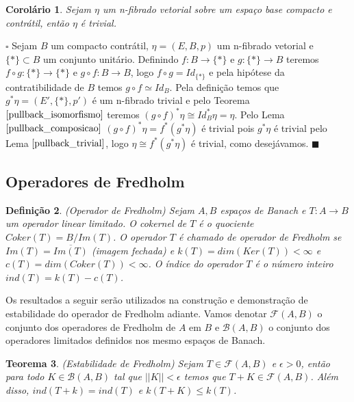 \documentclass[12pt]{book}
\newtheorem{teorema}{Teorema}[section]
\newtheorem{corolario}[teorema]{Corolário}
\newtheorem{definicao}[teorema]{Definição}
\newenvironment{prova}[1]{$\square$ #1}{\hfill$\blacksquare$}
\newcommand{\operadoresfredholm}[2]{\mathcal{F}(#1, #2)}
\newcommand{\operadoreslimitados}[2]{\mathcal{B}(#1, #2)}
\begin{document}
	\begin{corolario}\label{pullback_contratil}
		Sejam $\eta$ um n-fibrado vetorial sobre um espaço base compacto e contrátil, então $\eta$ é trivial.
	\end{corolario}
	\begin{prova}
		Sejam $B$ um compacto contrátil, $\eta=(E, B, p)$ um n-fibrado vetorial e $\{*\} \subset B$ um conjunto unitário. Definindo $f:B\to \{*\}$ e $g:\{*\}\to B$ teremos $f\circ g : \{*\} \to \{*\}$ e $g\circ f:B\to B$, logo $f\circ g = Id_{\{*\}}$ e pela hipótese da contratibilidade de $B$ temos $g\circ f \simeq Id_{B}$. Pela definição temos que $g^{*}\eta = (E', \{*\}, p')$ é um n-fibrado trivial e pelo Teorema $\ref{pullback_isomorfismo}$ teremos $(g\circ f)^{*}\eta \cong Id_{B}^{*}\eta = \eta$. Pelo Lema $\ref{pullback_composicao}$ $(g\circ f)^{*}\eta = f^{*}(g^{*}\eta) $ é trivial pois $g^{*}\eta$ é trivial pelo Lema $\ref{pullback_trivial}$, logo $ \eta \cong f^{*}(g^{*}\eta)$ é trivial, como desejávamos.
	\end{prova}
	
	\subsection{Operadores de Fredholm}
	\begin{definicao}\label{definicao_oeprador_fredholm}
		(Operador de Fredholm) Sejam $A, B$ espaços de Banach e $T: A\to B$ um operador linear limitado. O cokernel de $T$ é o quociente $Coker(T)=B/Im(T)$. O operador $T$ é chamado de operador de Fredholm se $Im(T)=\overline{Im(T)}$ (imagem fechada) e $k(T) = dim(Ker(T)) < \infty$ e $c(T)=dim(Coker(T)) < \infty$. O índice do operador $T$ é o número inteiro $ind(T) = k(T) - c(T)$.  
	\end{definicao}
	
	Os resultados a seguir serão utilizados na construção e demonstração de estabilidade do operador de Fredholm adiante. Vamos denotar $\operadoresfredholm{A}{B}$ o conjunto dos operadores de Fredholm de $A$ em $B$ e $\operadoreslimitados{A}{B}$ o conjunto dos operadores limitados definidos nos mesmo espaços de Banach.

	\begin{teorema}\label{teorema_estabilidade_fredholm}
		(Estabilidade de Fredholm) Sejam  $T \in \operadoresfredholm{A}{B}$ e $\epsilon>0$, então para todo $K \in \operadoreslimitados{A}{B}$ tal que $||K|| < \epsilon$ temos que $T+K \in \operadoresfredholm{A}{B}$. Além disso, $ind(T+k)=ind(T)$ e $k(T+K) \leq k(T)$.
	\end{teorema}
	
\end{document}
